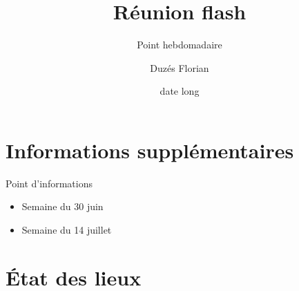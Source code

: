 \documentclass[A4,svgnames,9pt,aspectratio=169]{beamer}
\title[titrecourt]{Réunion flash}
\subtitle{Point hebdomadaire}
\date[25/06/2025]{date long}
\author[Duzes Florian]{Duzés Florian}
\begin{document}

\frame{\titlepage}


\renewcommand{\contentsname}{Sommaire}

\frame{\tocpage}



\section{Informations supplémentaires}
\frame{\sectionpage}


\begin{frame}{Point d'informations}

  \begin{itemize}
    \item Semaine du 30 juin 
    \item Semaine du 14 juillet 
  \end{itemize}
  
\end{frame}

 
\section{État des lieux}
\frame{\sectionpage}
\end{document}
